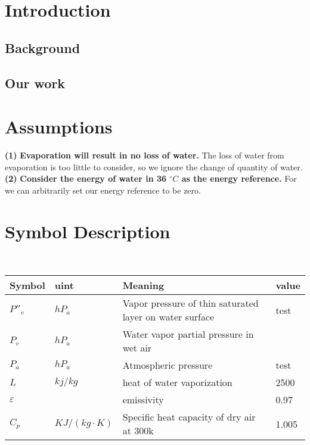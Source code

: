 \documentclass{mcmthesis}
\begin{document}
\setcounter{page}{1}
\section{Introduction}
\subsection{Background}%

\subsection{Our work}


\section{Assumptions}
\noindent
{\bf (1) } \textbf{Evaporation will result in no loss of water.} The loss of water from evaporation is too little to consider, so we ignore the change of quantity of water.\\
{\bf (2) } \textbf{Consider the energy of water in 36 ${^\circ}C$ as the energy reference.} For we can arbitrarily set our energy reference to be zero.\\

\section{Symbol Description}
\begin{table}[H]
        \setlength{\abovecaptionskip}{0pt}
        \setlength{\belowcaptionskip}{0pt}
				\\
        \begin{tabular}{p{2cm}|p{2cm}|p{7.5cm}|p{1.7cm}}
		\hline
		\rowcolor[gray]{0.9}\bf{Symbol}	&\bf{uint}      &\bf{Meaning}&\bf{value}	\\
		\hline
		${P}''_{v}$		& $hP_{a}$		 & Vapor pressure of thin saturated layer on water surface  &test\\
		$P_{v}$		& $hP_{a}$		 & Water vapor partial pressure in wet air\\
		$P_{a}$		& $hP_{a}$		 & Atmospheric pressure  &test\\
		$L$		& $kj/kg$		 & heat of water vaporization&2500\\
		$\varepsilon$		& 		 & emissivity&0.97\\
		$C_{p}$		& $KJ/(kg\cdot K)$		 & Specific heat capacity of dry air at 300k &1.005\\
		\hline
		\end{tabular}
	\end{table}
\end{document}
